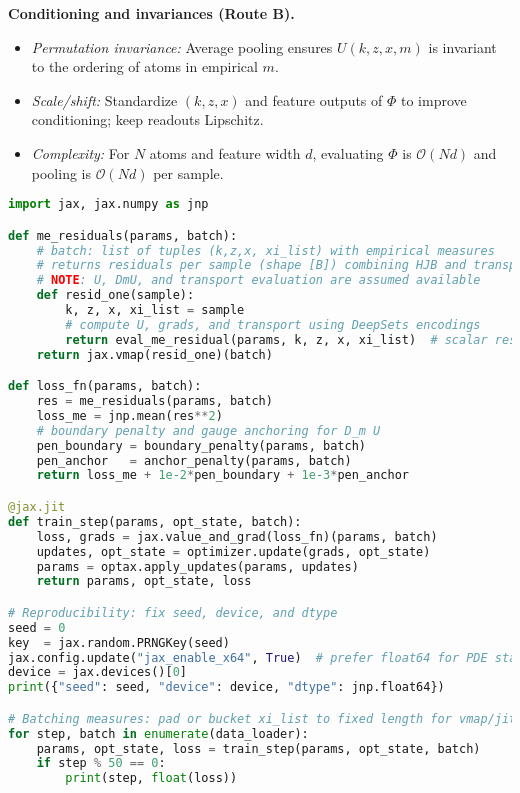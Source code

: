 ﻿\documentclass[11pt,letterpaper,oneside]{article}
\numberwithin{equation}{section}
\newcommand{\1}{\mathbf{1}}
\begin{document}
\begin{tcolorbox}[mathstyle]
\textbf{Conditioning and invariances (Route B).}
\begin{itemize}[leftmargin=1.15em,itemsep=0.25em]
  \item \emph{Permutation invariance:} Average pooling ensures $U(k,z,x,m)$ is invariant to the ordering of atoms in empirical $m$.
  \item \emph{Scale/shift:} Standardize $(k,z,x)$ and feature outputs of $\Phi$ to improve conditioning; keep readouts Lipschitz.
  \item \emph{Complexity:} For $N$ atoms and feature width $d$, evaluating $\Phi$ is $\mathcal O(N d)$ and pooling is $\mathcal O(N d)$ per sample.
\end{itemize}
\end{tcolorbox}

\begin{lstlisting}[language=Python,caption={Pseudo-JAX training loop for Route B (ME residual minimization)}]
import jax, jax.numpy as jnp

def me_residuals(params, batch):
    # batch: list of tuples (k,z,x, xi_list) with empirical measures
    # returns residuals per sample (shape [B]) combining HJB and transport terms
    # NOTE: U, DmU, and transport evaluation are assumed available
    def resid_one(sample):
        k, z, x, xi_list = sample
        # compute U, grads, and transport using DeepSets encodings
        return eval_me_residual(params, k, z, x, xi_list)  # scalar residual
    return jax.vmap(resid_one)(batch)

def loss_fn(params, batch):
    res = me_residuals(params, batch)
    loss_me = jnp.mean(res**2)
    # boundary penalty and gauge anchoring for D_m U
    pen_boundary = boundary_penalty(params, batch)
    pen_anchor   = anchor_penalty(params, batch)
    return loss_me + 1e-2*pen_boundary + 1e-3*pen_anchor

@jax.jit
def train_step(params, opt_state, batch):
    loss, grads = jax.value_and_grad(loss_fn)(params, batch)
    updates, opt_state = optimizer.update(grads, opt_state)
    params = optax.apply_updates(params, updates)
    return params, opt_state, loss

# Reproducibility: fix seed, device, and dtype
seed = 0
key  = jax.random.PRNGKey(seed)
jax.config.update("jax_enable_x64", True)  # prefer float64 for PDE stability
device = jax.devices()[0]
print({"seed": seed, "device": device, "dtype": jnp.float64})

# Batching measures: pad or bucket xi_list to fixed length for vmap/jit
for step, batch in enumerate(data_loader):
    params, opt_state, loss = train_step(params, opt_state, batch)
    if step % 50 == 0:
        print(step, float(loss))
\end{lstlisting}
\end{document}
